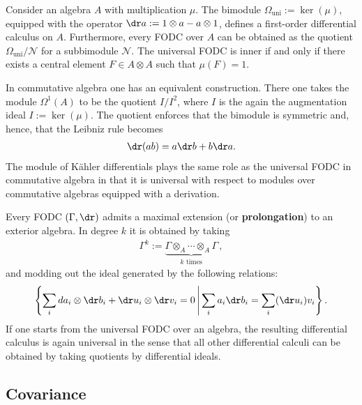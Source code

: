     \begin{example}
        Consider an algebra $A$ with multiplication $\mu$. The bimodule $\Omega_\text{uni}:=\ker(\mu)$, equipped with the operator $\dr a:=1\otimes a-a\otimes1$, defines a first-order differential calculus on $A$. Furthermore, every FODC over $A$ can be obtained as the quotient $\Omega_\text{uni}/\mathcal{N}$ for a subbimodule $\mathcal{N}$. The universal FODC is inner if and only if there exists a central element $F\in A\otimes A$ such that $\mu(F)=1$.
    \end{example}
    \begin{example}
        In commutative algebra one has an equivalent construction. There one takes the module $\Omega^1(A)$ to be the quotient $I/I^2$, where $I$ is the again the augmentation ideal $I:=\ker(\mu)$. The quotient enforces that the bimodule is symmetric and, hence, that the Leibniz rule becomes
        \begin{gather}
            \dr(ab) = a\dr b + b\dr a.
        \end{gather}
        The module of K\"ahler differentials plays the same role as the universal FODC in commutative algebra in that it is universal with respect to modules over commutative algebras equipped with a derivation.
    \end{example}


    \begin{property}[Prolongation]\label{qa:prolongation}
        Every FODC $(\Gamma,\dr)$ admits a maximal extension (or \textbf{prolongation}) to an exterior algebra. In degree $k$ it is obtained by taking
        \begin{gather}
            \Gamma^k := \underbrace{\Gamma\otimes_A\cdots\otimes_A\Gamma}_{k\text{ times}}\,,
        \end{gather}
        and modding out the ideal generated by the following relations:
        \begin{gather}
            \left\{\sum_ida_i\otimes\dr b_i+\dr u_i\otimes\dr v_i=0\,\middle\vert\,\sum_ia_i\dr b_i=\sum_i(\dr u_i)v_i\right\}.
        \end{gather}
        If one starts from the universal FODC over an algebra, the resulting differential calculus is again universal in the sense that all other differential calculi can be obtained by taking quotients by differential ideals.
    \end{property}

\subsection{Covariance}

